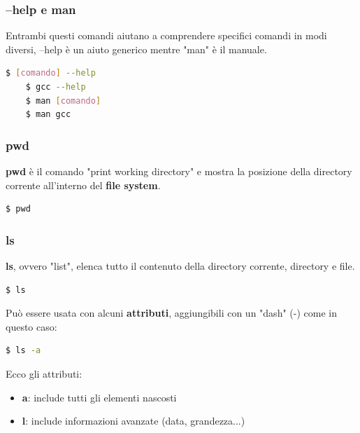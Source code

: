\documentclass[12pt,a4paper]{article}
\begin{document}
\subsubsection{--help e man}
Entrambi questi comandi aiutano a comprendere specifici comandi in modi diversi, --help è un aiuto generico mentre "man" è il manuale.
\begin{lstlisting}[language=bash]
    $ [comando] --help
    $ gcc --help
    $ man [comando]
    $ man gcc
\end{lstlisting}
\subsubsection{pwd}
\textbf{pwd} è il comando "print working directory" e mostra la posizione della directory corrente all'interno del \textbf{file system}.
\begin{lstlisting}[language=bash]
    $ pwd
\end{lstlisting}
\subsubsection{ls}
\textbf{ls}, ovvero "list", elenca tutto il contenuto della directory corrente, directory e file.
\begin{lstlisting}[language=bash]
    $ ls
\end{lstlisting}
Può essere usata con alcuni \textbf{attributi}, aggiungibili con un "dash" (-) come in questo caso:
\begin{lstlisting}[language=bash]
    $ ls -a
\end{lstlisting}
Ecco gli attributi:
\begin{itemize}
    \item \textbf{a}: include tutti gli elementi nascosti
    \item \textbf{l}: include informazioni avanzate (data, grandezza...)
\end{itemize}
\end{document}
